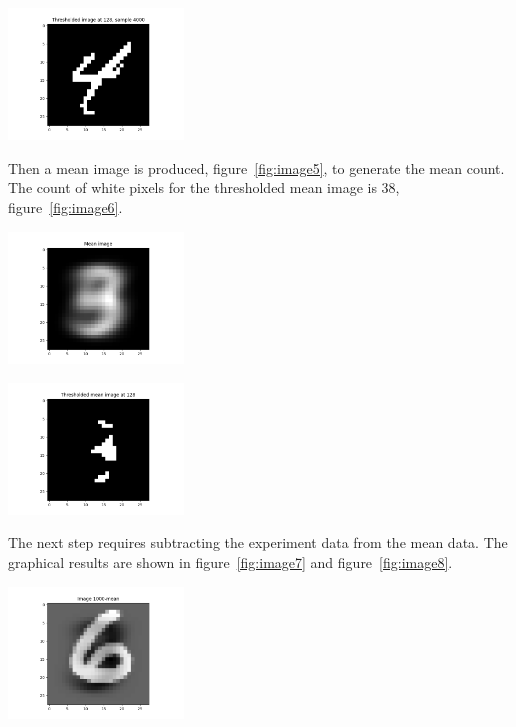 \begin{center}
\includegraphics[width=0.35\textwidth]{image4.png}
\end{center}

Then a mean image is produced, figure~\ref{fig:image5}, to generate the mean count.
The count of white pixels for the thresholded mean image is 38, figure~\ref{fig:image6}.

\begin{center}
\includegraphics[width=0.35\textwidth]{image5.png}
\end{center}

\begin{center}
\includegraphics[width=0.35\textwidth]{image6.png}
\end{center}

The next step requires subtracting the experiment data from the mean data. The graphical results are shown in figure~\ref{fig:image7} and figure~\ref{fig:image8}.

\begin{center}
\includegraphics[width=0.35\textwidth]{image7.png}
\end{center}

